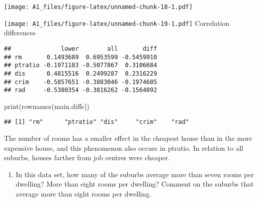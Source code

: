 \documentclass[
]{article}
\newenvironment{Shaded}{\begin{snugshade}}{\end{snugshade}}
\newcommand{\AttributeTok}[1]{\textcolor[rgb]{0.77,0.63,0.00}{#1}}
\newcommand{\DecValTok}[1]{\textcolor[rgb]{0.00,0.00,0.81}{#1}}
\newcommand{\FunctionTok}[1]{\textcolor[rgb]{0.00,0.00,0.00}{#1}}
\newcommand{\NormalTok}[1]{#1}
\newcommand{\OtherTok}[1]{\textcolor[rgb]{0.56,0.35,0.01}{#1}}
\newcommand{\SpecialCharTok}[1]{\textcolor[rgb]{0.00,0.00,0.00}{#1}}
\newcommand{\StringTok}[1]{\textcolor[rgb]{0.31,0.60,0.02}{#1}}
\providecommand{\tightlist}{%
  \setlength{\itemsep}{0pt}\setlength{\parskip}{0pt}}
\begin{document}
\texttt{[image: A1\_files/figure-latex/unnamed-chunk-18-1.pdf]}

\begin{Shaded}
\end{Shaded}

\texttt{[image: A1\_files/figure-latex/unnamed-chunk-19-1.pdf]}
Correlation differences

\begin{Shaded}
\end{Shaded}

\begin{verbatim}
##              lower        all       diff
## rm       0.1493689  0.6953599 -0.5459910
## ptratio -0.1971183 -0.5077867  0.3106684
## dis      0.4815516  0.2499287  0.2316229
## crim    -0.5857651 -0.3883046 -0.1974605
## rad     -0.5380354 -0.3816262 -0.1564092
\end{verbatim}

\begin{Shaded}
\begin{Highlighting}[]
\FunctionTok{print}\NormalTok{(}\FunctionTok{rownames}\NormalTok{(main.diffs))}
\end{Highlighting}
\end{Shaded}

\begin{verbatim}
## [1] "rm"      "ptratio" "dis"     "crim"    "rad"
\end{verbatim}

The number of rooms has a smaller effect in the cheapest house than in
the more expensive house, and this phenomenon also occurs in ptratio. In
relation to all suburbs, houses farther from job centres were cheaper.

\begin{enumerate}
\def\labelenumi{(\alph{enumi})}
\setcounter{enumi}{7}
\tightlist
\item
  In this data set, how many of the suburbs average more than seven
  rooms per dwelling? More than eight rooms per dwelling? Comment on the
  suburbs that average more than eight rooms per dwelling.
\end{enumerate}
\end{document}
